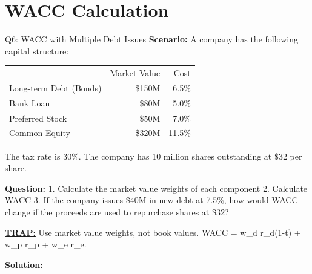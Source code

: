 \documentclass{beamer}
\renewcommand{\scriptsize}{\fontsize{6pt}{7pt}\selectfont}
\begin{document}
	
	\section{WACC Calculation}
	
	\begin{frame}{Q6: WACC with Multiple Debt Issues}
		\scriptsize
		\textbf{Scenario:} A company has the following capital structure:
		
		\begin{tabular}{lrr}
			& Market Value & Cost \\
			Long-term Debt (Bonds) & \$150M & 6.5\% \\
			Bank Loan & \$80M & 5.0\% \\
			Preferred Stock & \$50M & 7.0\% \\
			Common Equity & \$320M & 11.5\% \\
		\end{tabular}
		
		The tax rate is 30\%. The company has 10 million shares outstanding at \$32 per share.
		
		\textbf{Question:}
		1. Calculate the market value weights of each component
		2. Calculate WACC
		3. If the company issues \$40M in new debt at 7.5\%, how would WACC change if the proceeds are used to repurchase shares at \$32?
		
		\vspace{2pt}
		\underline{\textbf{TRAP:}} Use market value weights, not book values. WACC = w\_d r\_d(1-t) + w\_p r\_p + w\_e r\_e.
		
		\vspace{4pt}
		\underline{\textbf{Solution:}}
	\end{frame}
	
\end{document}
